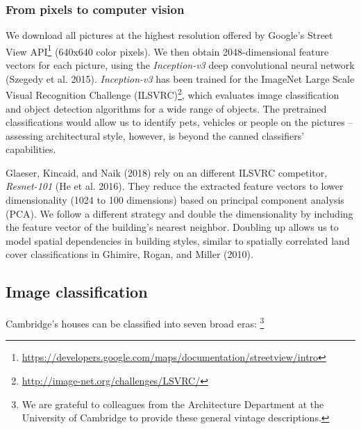 \documentclass[]{article}
\let\rmarkdownfootnote\footnote%
\def\footnote{\protect\rmarkdownfootnote}
\begin{document}
\hypertarget{from-pixels-to-computer-vision}{%
\subsubsection{From pixels to computer
vision}\label{from-pixels-to-computer-vision}}

We download all pictures at the highest resolution offered by Google's
Street View
API\footnote{\href{https://developers.google.com/maps/documentation/streetview/intro}{https://developers.google.com/maps/documentation/streetview/intro}}
(640x640 color pixels). We then obtain 2048-dimensional feature vectors
for each picture, using the \emph{Inception-v3} deep convolutional
neural network (Szegedy et al. 2015). \emph{Inception-v3} has been
trained for the ImageNet Large Scale Visual Recognition Challenge
(ILSVRC)\footnote{\url{http://image-net.org/challenges/LSVRC/}}, which
evaluates image classification and object detection algorithms for a
wide range of objects. The pretrained classifications would allow us to
identify pets, vehicles or people on the pictures -- assessing
architectural style, however, is beyond the canned classifiers'
capabilities.

Glaeser, Kincaid, and Naik (2018) rely on an different ILSVRC
competitor, \emph{Resnet-101} (He et al. 2016). They reduce the
extracted feature vectors to lower dimensionality (1024 to 100
dimensions) based on principal component analysis (PCA). We follow a
different strategy and double the dimensionality by including the
feature vector of the building's nearest neighbor. Doubling up allows us
to model spatial dependencies in building styles, similar to spatially
correlated land cover classifications in Ghimire, Rogan, and Miller
(2010).

\hypertarget{image-classification}{%
\subsection{Image classification}\label{image-classification}}

Cambridge's houses can be classified into seven broad eras:
\footnote{We are grateful to colleagues from the Architecture Department at the University of Cambridge to provide these general vintage descriptions.}
\end{document}

